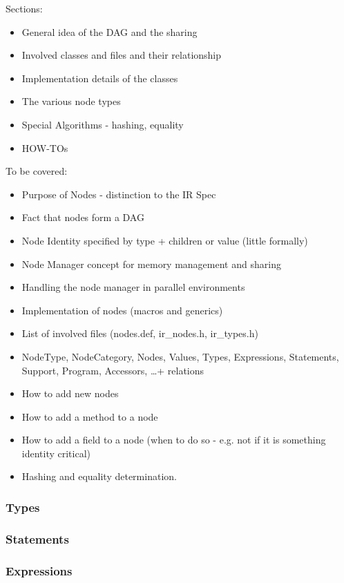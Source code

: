 Sections:
\begin{itemize}
  \item General idea of the DAG and the sharing
  \item Involved classes and files and their relationship
  \item Implementation details of the classes
  \item The various node types
  \item Special Algorithms - hashing, equality
  \item HOW-TOs
\end{itemize}


\label{sec:Compiler.Core.NodesAndManagers.Factories}

To be covered:
\begin{itemize}
  \item Purpose of Nodes - distinction to the IR Spec
  \item Fact that nodes form a DAG
  \item Node Identity specified by type + children or value (little formally)
  \item Node Manager concept for memory management and sharing
  \item Handling the node manager in parallel environments
  \item Implementation of nodes (macros and generics)
  \item List of involved files (nodes.def, ir\_nodes.h, ir\_types.h)
  \item NodeType, NodeCategory, Nodes, Values, Types, Expressions, Statements,
  Support, Program, Accessors, \ldots + relations
  \item How to add new nodes
  \item How to add a method to a node
  \item How to add a field to a node (when to do so - e.g. not if it is
  something identity critical)
  \item Hashing and equality determination.
\end{itemize}


\subsubsection{Types}
\subsubsection{Statements}
\subsubsection{Expressions}
